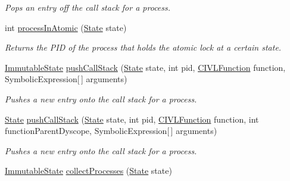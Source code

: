 \begin{DoxyCompactItemize}
\begin{DoxyCompactList}\small\item\em Pops an entry off the call stack for a process. \end{DoxyCompactList}\item 
int \hyperlink{classedu_1_1udel_1_1cis_1_1vsl_1_1civl_1_1state_1_1common_1_1immutable_1_1ImmutableStateFactory_aef485d98a0babfec8acc14a129cc4611}{process\+In\+Atomic} (\hyperlink{interfaceedu_1_1udel_1_1cis_1_1vsl_1_1civl_1_1state_1_1IF_1_1State}{State} state)
\begin{DoxyCompactList}\small\item\em Returns the P\+I\+D of the process that holds the atomic lock at a certain state. \end{DoxyCompactList}\item 
\hyperlink{classedu_1_1udel_1_1cis_1_1vsl_1_1civl_1_1state_1_1common_1_1immutable_1_1ImmutableState}{Immutable\+State} \hyperlink{classedu_1_1udel_1_1cis_1_1vsl_1_1civl_1_1state_1_1common_1_1immutable_1_1ImmutableStateFactory_a0ff6fe5b054069da0b20967e254b5ae4}{push\+Call\+Stack} (\hyperlink{interfaceedu_1_1udel_1_1cis_1_1vsl_1_1civl_1_1state_1_1IF_1_1State}{State} state, int pid, \hyperlink{interfaceedu_1_1udel_1_1cis_1_1vsl_1_1civl_1_1model_1_1IF_1_1CIVLFunction}{C\+I\+V\+L\+Function} function, Symbolic\+Expression\mbox{[}$\,$\mbox{]} arguments)
\begin{DoxyCompactList}\small\item\em Pushes a new entry onto the call stack for a process. \end{DoxyCompactList}\item 
\hyperlink{interfaceedu_1_1udel_1_1cis_1_1vsl_1_1civl_1_1state_1_1IF_1_1State}{State} \hyperlink{classedu_1_1udel_1_1cis_1_1vsl_1_1civl_1_1state_1_1common_1_1immutable_1_1ImmutableStateFactory_a8fc946088739b623a3ccc49ed2544b11}{push\+Call\+Stack} (\hyperlink{interfaceedu_1_1udel_1_1cis_1_1vsl_1_1civl_1_1state_1_1IF_1_1State}{State} state, int pid, \hyperlink{interfaceedu_1_1udel_1_1cis_1_1vsl_1_1civl_1_1model_1_1IF_1_1CIVLFunction}{C\+I\+V\+L\+Function} function, int function\+Parent\+Dyscope, Symbolic\+Expression\mbox{[}$\,$\mbox{]} arguments)
\begin{DoxyCompactList}\small\item\em Pushes a new entry onto the call stack for a process. \end{DoxyCompactList}\item 
\hyperlink{classedu_1_1udel_1_1cis_1_1vsl_1_1civl_1_1state_1_1common_1_1immutable_1_1ImmutableState}{Immutable\+State} \hyperlink{classedu_1_1udel_1_1cis_1_1vsl_1_1civl_1_1state_1_1common_1_1immutable_1_1ImmutableStateFactory_a4e0a1ff9fd037a1afdd7e9c6dce4a18b}{collect\+Processes} (\hyperlink{interfaceedu_1_1udel_1_1cis_1_1vsl_1_1civl_1_1state_1_1IF_1_1State}{State} state)

\end{DoxyCompactItemize}
